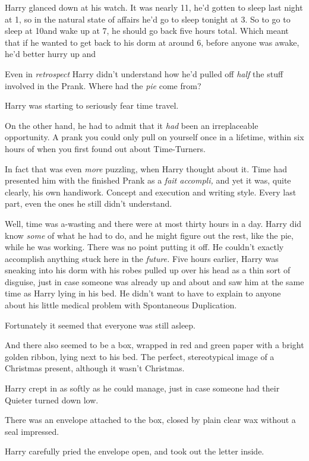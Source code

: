 Harry glanced down at his watch. It was nearly 11\AM, he'd gotten to sleep last
night at 1\AM, so in the natural state of affairs he'd go to sleep tonight at
3\AM. So to go to sleep at 10\PM and wake up at 7\AM, he should go back five hours
total. Which meant that if he wanted to get back to his dorm at around 6\AM,
before anyone was awake, he'd better hurry up and{\el}

Even in \emph{retrospect} Harry didn't understand how he'd pulled off
\emph{half} the stuff involved in the Prank. Where had the \emph{pie} come from?

Harry was starting to seriously fear time travel.

On the other hand, he had to admit that it \emph{had} been an irreplaceable
opportunity. A prank you could only pull on yourself once in a lifetime, within
six hours of when you first found out about Time-Turners.

In fact that was even \emph{more} puzzling, when Harry thought about it. Time
had presented him with the finished Prank as a \emph{fait accompli,} and yet it
was, quite clearly, his own handiwork. Concept and execution and writing style.
Every last part, even the ones he still didn't understand.

Well, time was a-wasting and there were at most thirty hours in a day. Harry
did know \emph{some} of what he had to do, and he might figure out the rest,
like the pie, while he was working. There was no point putting it off. He
couldn't exactly accomplish anything stuck here in the \emph{future.}
\sbreak
Five hours earlier, Harry was sneaking into his dorm with his robes pulled up
over his head as a thin sort of disguise, just in case someone was already up
and about and saw him at the same time as Harry lying in his bed. He didn't
want to have to explain to anyone about his little medical problem with
Spontaneous Duplication.

Fortunately it seemed that everyone was still asleep.

And there also seemed to be a box, wrapped in red and green paper with a bright
golden ribbon, lying next to his bed. The perfect, stereotypical image of a
Christmas present, although it wasn't Christmas.

Harry crept in as softly as he could manage, just in case someone had their
Quieter turned down low.

There was an envelope attached to the box, closed by plain clear wax without a
seal impressed.

Harry carefully pried the envelope open, and took out the letter inside.

